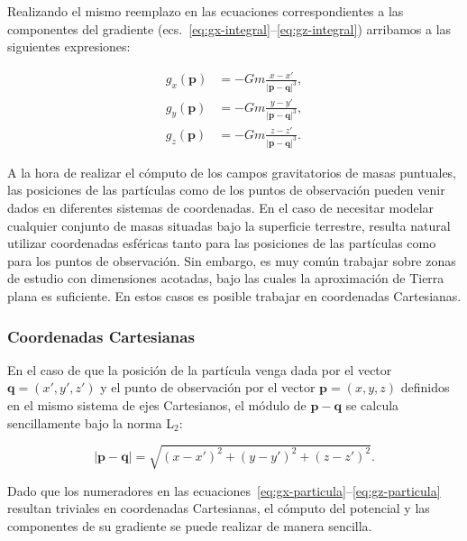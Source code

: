 Realizando el mismo reemplazo en las ecuaciones correspondientes a las
componentes del gradiente (ecs.~\ref{eq:gx-integral}--\ref{eq:gz-integral})
arribamos a las siguientes expresiones:

\begin{align}
    g_x(\mathbf{p}) &=
        - G m
        \frac{x - x'}{|\mathbf{p} - \mathbf{q}|^3},
    \label{eq:gx-particula}
    \\
    g_y(\mathbf{p}) &=
        - G m
        \frac{y - y'}{|\mathbf{p} - \mathbf{q}|^3},
    \label{eq:gy-particula}
    \\
    g_z(\mathbf{p}) &=
        - G m
        \frac{z - z'}{|\mathbf{p} - \mathbf{q}|^3}.
    \label{eq:gz-particula}
\end{align}

A la hora de realizar el cómputo de los campos gravitatorios de masas
puntuales, las posiciones de las partículas como de los puntos de observación
pueden venir dados en diferentes sistemas de coordenadas.
En el caso de necesitar modelar cualquier conjunto de masas situadas bajo la
superficie terrestre, resulta natural utilizar coordenadas esféricas tanto para
las posiciones de las partículas como para los puntos de observación.
Sin embargo, es muy común trabajar sobre zonas de estudio con dimensiones
acotadas, bajo las cuales la aproximación de Tierra plana es suficiente. En
estos casos es posible trabajar en coordenadas Cartesianas.

\subsubsection{Coordenadas Cartesianas}

En el caso de que la posición de la partícula venga dada por el vector
$\mathbf{q} = (x', y', z')$ y el punto de observación por el vector
$\mathbf{p} = (x, y, z)$ definidos en el mismo sistema de ejes Cartesianos, el
módulo de
$\mathbf{p} - \mathbf{q}$ se calcula sencillamente bajo la norma L$_2$:

\begin{equation}
    | \mathbf{p} - \mathbf{q} | = \sqrt{
        (x - x')^2 + (y - y')^2 + (z - z')^2
    }.
\end{equation}

Dado que los numeradores en las
ecuaciones~\ref{eq:gx-particula}--\ref{eq:gz-particula} resultan triviales en
coordenadas Cartesianas, el cómputo del potencial y las componentes de su
gradiente se puede realizar de manera sencilla.

